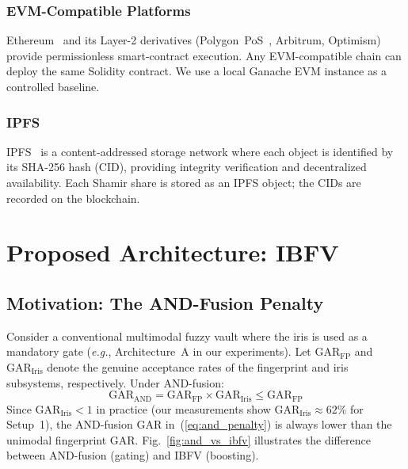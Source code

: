 \documentclass[3p,twocolumn]{elsarticle}
\newcommand{\IBFV}{\textsf{IBFV}}
\newcommand{\GAR}{\mathrm{GAR}}
\newcommand{\eg}{\textit{e.g.}}
\begin{document}
\subsubsection{EVM-Compatible Platforms}
Ethereum~\cite{buterin2014ethereum} and its Layer-2 derivatives (Polygon~PoS~\cite{polygon2021}, Arbitrum, Optimism) provide permissionless smart-contract execution. Any EVM-compatible chain can deploy the same Solidity contract. We use a local Ganache EVM instance as a controlled baseline.

\subsubsection{IPFS}
IPFS~\cite{benet2014ipfs} is a content-addressed storage network where each object is identified by its SHA-256 hash (CID), providing integrity verification and decentralized availability. Each Shamir share is stored as an IPFS object; the CIDs are recorded on the blockchain.

\section{Proposed Architecture: \IBFV{}}
\label{sec:proposed}

\subsection{Motivation: The AND-Fusion Penalty}
\label{sec:motivation}

Consider a conventional multimodal fuzzy vault where the iris is used as a mandatory gate (\eg{}, Architecture~A in our experiments). Let $\GAR_{\text{FP}}$ and $\GAR_{\text{Iris}}$ denote the genuine acceptance rates of the fingerprint and iris subsystems, respectively. Under AND-fusion:
\begin{equation}
    \GAR_{\text{AND}} = \GAR_{\text{FP}} \times \GAR_{\text{Iris}} \leq \GAR_{\text{FP}}
    \label{eq:and_penalty}
\end{equation}
Since $\GAR_{\text{Iris}} < 1$ in practice (our measurements show $\GAR_{\text{Iris}} \approx 62\%$ for Setup~1), the AND-fusion GAR in~(\ref{eq:and_penalty}) is always lower than the unimodal fingerprint GAR. Fig.~\ref{fig:and_vs_ibfv} illustrates the difference between AND-fusion (gating) and \IBFV{} (boosting).
\end{document}
